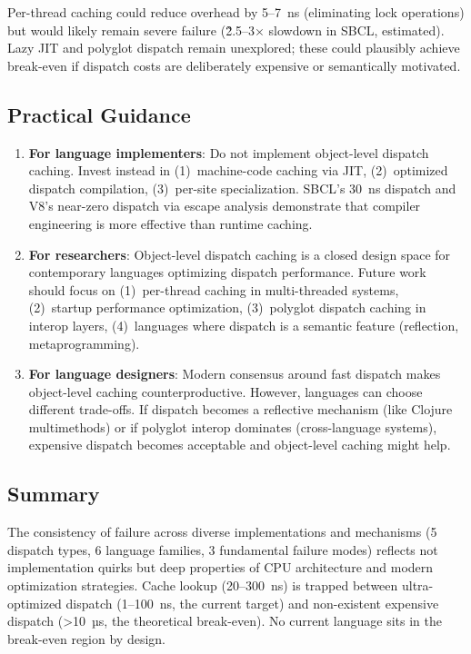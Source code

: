 \documentclass[sigplan,final,acmsmall,review,screen]{acmart}
\begin{document}
Per-thread caching could reduce overhead by 5--7~ns (eliminating lock operations) but would likely remain severe failure
(\~2.5--3× slowdown in SBCL, estimated). Lazy JIT and polyglot dispatch remain unexplored; these could plausibly achieve break-even
if dispatch costs are deliberately expensive or semantically motivated.

\subsection{Practical Guidance}

\begin{enumerate}
  \item \textbf{For language implementers}: Do not implement object-level dispatch caching. Invest instead in (1)~machine-code caching
    via JIT, (2)~optimized dispatch compilation, (3)~per-site specialization. SBCL's 30~ns dispatch and V8's near-zero dispatch via
    escape analysis demonstrate that compiler engineering is more effective than runtime caching.

  \item \textbf{For researchers}: Object-level dispatch caching is a closed design space for contemporary languages optimizing dispatch performance.
    Future work should focus on (1)~per-thread caching in multi-threaded systems, (2)~startup performance optimization, (3)~polyglot dispatch
    caching in interop layers, (4)~languages where dispatch is a semantic feature (reflection, metaprogramming).

  \item \textbf{For language designers}: Modern consensus around fast dispatch makes object-level caching counterproductive.
    However, languages can choose different trade-offs. If dispatch becomes a reflective mechanism (like Clojure multimethods) or
    if polyglot interop dominates (cross-language systems), expensive dispatch becomes acceptable and object-level caching might help.
\end{enumerate}

\subsection{Summary}

The consistency of failure across diverse implementations and mechanisms (5 dispatch types, 6 language families, 3 fundamental failure modes)
reflects not implementation quirks but deep properties of CPU architecture and modern optimization strategies. Cache lookup (20--300~ns) is
trapped between ultra-optimized dispatch (1--100~ns, the current target) and non-existent expensive dispatch (>10~µs, the theoretical break-even).
No current language sits in the break-even region by design.
\end{document}
